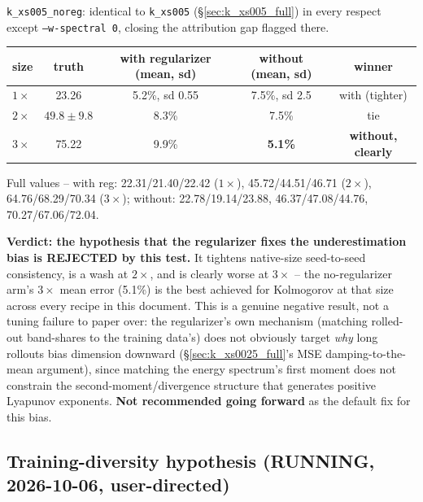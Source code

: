 \documentclass[11pt]{article}
\begin{document}
\texttt{k\_xs005\_noreg}: identical to \texttt{k\_xs005}
(\S\ref{sec:k_xs005_full}) in every respect except \texttt{--w-spectral 0},
closing the attribution gap flagged there.
\begin{center}
\small
\begin{tabular}{lcccc}
\toprule
size & truth & with regularizer (mean, sd) & without (mean, sd) & winner \\
\midrule
$1\times$ & 23.26 & 5.2\%, sd 0.55 & 7.5\%, sd 2.5 & with (tighter) \\
$2\times$ & $49.8\pm9.8$ & 8.3\% & 7.5\% & tie \\
$3\times$ & 75.22 & 9.9\% & \textbf{5.1\%} & \textbf{without, clearly} \\
\bottomrule
\end{tabular}
\end{center}
Full values -- with reg: 22.31/21.40/22.42 ($1\times$), 45.72/44.51/46.71
($2\times$), 64.76/68.29/70.34 ($3\times$); without: 22.78/19.14/23.88,
46.37/47.08/44.76, 70.27/67.06/72.04.

\textbf{Verdict: the hypothesis that the regularizer fixes the
underestimation bias is REJECTED by this test.} It tightens native-size
seed-to-seed consistency, is a wash at $2\times$, and is clearly worse at
$3\times$ -- the no-regularizer arm's $3\times$ mean error (5.1\%) is the
best achieved for Kolmogorov at that size across every recipe in this
document. This is a genuine negative result, not a tuning failure to
paper over: the regularizer's own mechanism (matching rolled-out
band-shares to the training data's) does not obviously target \emph{why}
long rollouts bias dimension downward (\S\ref{sec:k_xs0025_full}'s MSE
damping-to-the-mean argument), since matching the energy spectrum's
first moment does not constrain the second-moment/divergence structure
that generates positive Lyapunov exponents. \textbf{Not recommended
going forward} as the default fix for this bias.

\subsection{Training-diversity hypothesis (RUNNING, 2026-10-06,
user-directed)}
\label{sec:diversity_hypothesis}
\end{document}

